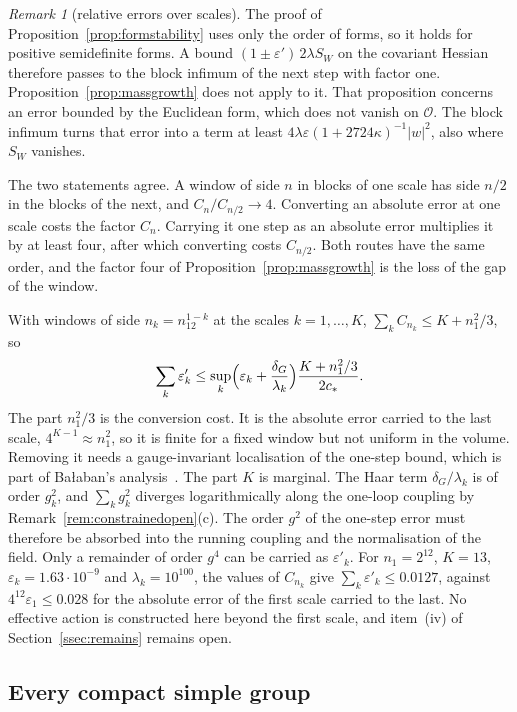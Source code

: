 \documentclass[11pt]{amsart}
\theoremstyle{definition}
\theoremstyle{remark}
\newtheorem{remark}[theorem]{Remark}
\numberwithin{equation}{section}
\begin{document}
\begin{remark}[relative errors over scales]\label{rem:relscales}
The proof of Proposition~\ref{prop:formstability} uses only the order of
forms, so it holds for positive semidefinite forms. A bound $(1\pm
\varepsilon')\,2\lambda S_W$ on the covariant Hessian therefore passes to
the block infimum of the next step with factor one.
Proposition~\ref{prop:massgrowth} does not apply to it. That proposition
concerns an error bounded by the Euclidean form, which does not vanish on
$\mathcal O$. The block infimum turns that error into a term at least
$4\lambda\varepsilon(1+2724\kappa)^{-1}|w|^2$, also where $S_W$ vanishes.

The two statements agree. A window of side $n$ in blocks of one scale has
side $n/2$ in the blocks of the next, and $C_n/C_{n/2}\to4$. Converting an
absolute error at one scale costs the factor $C_n$. Carrying it one step as
an absolute error multiplies it by at least four, after which converting
costs $C_{n/2}$. Both routes have the same order, and the factor four of
Proposition~\ref{prop:massgrowth} is the loss of the gap of the window.

With windows of side $n_k=n_12^{1-k}$ at the scales $k=1,\dots,K$,
$\sum_kC_{n_k}\le K+n_1^2/3$, so
\[
\sum_k\varepsilon'_k\le\sup_k\Bigl(\varepsilon_k+\frac{\delta_G}{\lambda_k}
\Bigr)\frac{K+n_1^2/3}{2c_*}.
\]
The part $n_1^2/3$ is the conversion cost. It is the absolute error carried
to the last scale, $4^{K-1}\approx n_1^2$, so it is finite for a fixed
window but not uniform in the volume. Removing it needs a gauge-invariant
localisation of the one-step bound, which is part of
Ba{\l}aban's analysis~\cite{Bal89b}. The part $K$ is marginal. The Haar term $\delta_G/\lambda_k$ is of order
$g_k^2$, and $\sum_kg_k^2$ diverges logarithmically along the one-loop
coupling by Remark~\ref{rem:constrainedopen}(c). The order $g^2$ of the
one-step error must therefore be absorbed into the running coupling and the
normalisation of the field. Only a remainder of order $g^4$ can be carried
as $\varepsilon'_k$. For $n_1=2^{12}$, $K=13$, $\varepsilon_k=1.63\cdot
10^{-9}$ and $\lambda_k=10^{100}$, the values of $C_{n_k}$ give $\sum_k
\varepsilon'_k\le0.0127$, against $4^{12}\varepsilon_1\le0.028$ for the absolute
error of the first scale carried to the last. No effective action is constructed here beyond the first
scale, and item~(iv) of Section~\ref{ssec:remains} remains open.
\end{remark}

\subsection{Every compact simple group}\label{ssec:groups13}
\end{document}
